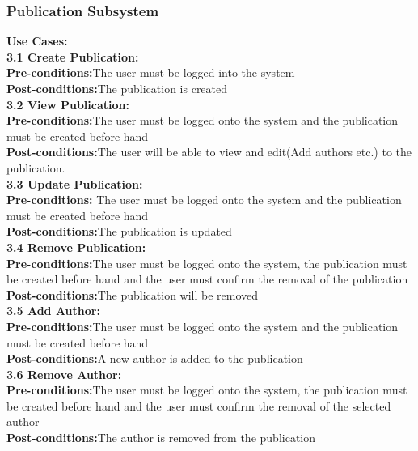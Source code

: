 \documentclass{article}
\begin{document}
			\subsubsection{Publication Subsystem}
				\textbf{Use Cases:}\\
				\indent \textbf{3.1 Create Publication:}\\
					\indent \indent \textbf{Pre-conditions:}The user must be logged into the system\\
					\indent \indent \textbf{Post-conditions:}The publication is created\\
				\indent \textbf{3.2 View Publication:}\\
					\indent \indent \textbf{Pre-conditions:}The user must be logged onto the system and the publication must be created before hand\\
					\indent \indent \textbf{Post-conditions:}The user will be able to view and edit(Add authors etc.) to the publication.\\
				\indent \textbf{3.3 Update Publication:}\\
					\indent \indent \textbf{Pre-conditions:} The user must be logged onto the system and the publication must be created before hand\\
					\indent \indent \textbf{Post-conditions:}The publication is updated\\
				\indent \textbf{3.4 Remove Publication:}\\
					\indent \indent \textbf{Pre-conditions:}The user must be logged onto the system, the publication must be created before hand and the user must confirm the removal of the publication\\
					\indent \indent \textbf{Post-conditions:}The publication will be removed\\
				\indent \textbf{3.5 Add Author:}\\
					\indent \indent \textbf{Pre-conditions:}The user must be logged onto the system and the publication must be created before hand\\
					\indent \indent \textbf{Post-conditions:}A new author is added to the publication\\
				\indent \textbf{3.6 Remove Author:}\\
					\indent \indent \textbf{Pre-conditions:}The user must be logged onto the system, the publication must be created before hand and the user must confirm the removal of the selected author\\
					\indent \indent \textbf{Post-conditions:}The author is removed from the publication\\
\end{document}
